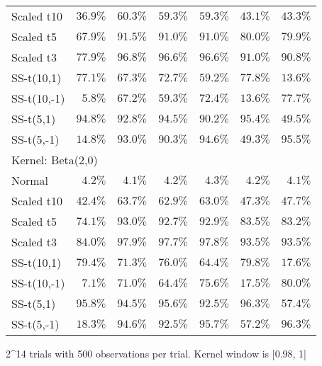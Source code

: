 \begin{longtable}{lrrrrrr}
Scaled t10 & $36.9\%$ & $60.3\%$ & $59.3\%$ & $59.3\%$ & $43.1\%$ & $43.3\%$ \\ 
Scaled t5 & $67.9\%$ & $91.5\%$ & $91.0\%$ & $91.0\%$ & $80.0\%$ & $79.9\%$ \\ 
Scaled t3 & $77.9\%$ & $96.8\%$ & $96.6\%$ & $96.6\%$ & $91.0\%$ & $90.8\%$ \\ 
SS-t(10,1) & $77.1\%$ & $67.3\%$ & $72.7\%$ & $59.2\%$ & $77.8\%$ & $13.6\%$ \\ 
SS-t(10,-1) & $5.8\%$ & $67.2\%$ & $59.3\%$ & $72.4\%$ & $13.6\%$ & $77.7\%$ \\ 
SS-t(5,1) & $94.8\%$ & $92.8\%$ & $94.5\%$ & $90.2\%$ & $95.4\%$ & $49.5\%$ \\ 
SS-t(5,-1) & $14.8\%$ & $93.0\%$ & $90.3\%$ & $94.6\%$ & $49.3\%$ & $95.5\%$ \\ 
\midrule
\multicolumn{7}{l}{Kernel: Beta(2,0)} \\ 
\midrule
Normal & $4.2\%$ & $4.1\%$ & $4.2\%$ & $4.3\%$ & $4.2\%$ & $4.1\%$ \\ 
Scaled t10 & $42.4\%$ & $63.7\%$ & $62.9\%$ & $63.0\%$ & $47.3\%$ & $47.7\%$ \\ 
Scaled t5 & $74.1\%$ & $93.0\%$ & $92.7\%$ & $92.9\%$ & $83.5\%$ & $83.2\%$ \\ 
Scaled t3 & $84.0\%$ & $97.9\%$ & $97.7\%$ & $97.8\%$ & $93.5\%$ & $93.5\%$ \\ 
SS-t(10,1) & $79.4\%$ & $71.3\%$ & $76.0\%$ & $64.4\%$ & $79.8\%$ & $17.6\%$ \\ 
SS-t(10,-1) & $7.1\%$ & $71.0\%$ & $64.4\%$ & $75.6\%$ & $17.5\%$ & $80.0\%$ \\ 
SS-t(5,1) & $95.8\%$ & $94.5\%$ & $95.6\%$ & $92.5\%$ & $96.3\%$ & $57.4\%$ \\ 
SS-t(5,-1) & $18.3\%$ & $94.6\%$ & $92.5\%$ & $95.7\%$ & $57.2\%$ & $96.3\%$ \\ 
\bottomrule
\end{longtable}
\begin{minipage}{\linewidth}
2\textasciicircum{}14 trials with 500 observations per trial. Kernel window is [0.98, 1]\\
\end{minipage}

